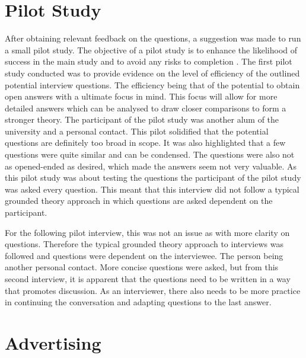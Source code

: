 \section{Pilot Study}

\par After obtaining relevant feedback on the questions, a suggestion was made to run a small pilot study.  The objective of a pilot study is to enhance the likelihood of success in the main study and to avoid any risks to completion \cite{pilot}. The first pilot study conducted was to provide evidence on the level of efficiency of the outlined potential interview questions. The efficiency being that of the potential to obtain open answers with a ultimate focus in mind. This focus will allow for more detailed answers which can be analysed to draw closer comparisons to form a stronger theory. The participant of the pilot study was another alum of the university and a personal contact. This pilot solidified that the potential questions are definitely too broad in scope. It was also highlighted that a few questions were quite similar and can be condensed. The questions were also not as opened-ended as desired, which made the answers seem not very valuable. As this pilot study was about testing the questions the participant of the pilot study was asked every question. This meant that this interview did not follow a typical grounded theory approach in which questions are asked dependent on the participant. 
\newline
\par For the following pilot interview, this was not an issue as with more clarity on questions. Therefore the typical grounded theory approach to interviews was followed and questions were dependent on the interviewee. The person being another personal contact. More concise questions were asked, but from this second interview, it is apparent that the questions need to be written in a way that promotes discussion. As an interviewer, there also needs to be more practice in continuing the conversation and adapting questions to the last answer. 

\section{Advertising}

